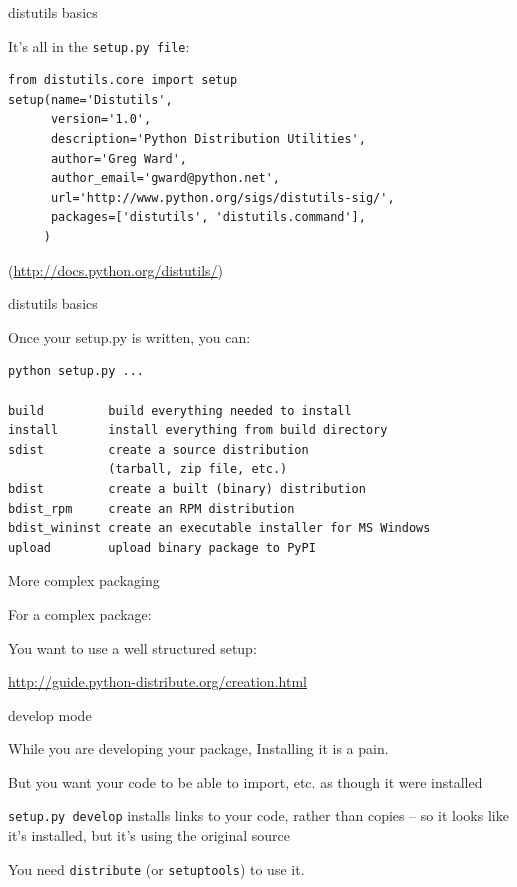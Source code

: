 \documentclass{beamer}
\begin{document}
\begin{frame}[fragile]{distutils basics}

\vfill
{\Large It's all in the \verb|setup.py file|:}

\begin{verbatim}
from distutils.core import setup
setup(name='Distutils',
      version='1.0',
      description='Python Distribution Utilities',
      author='Greg Ward',
      author_email='gward@python.net',
      url='http://www.python.org/sigs/distutils-sig/',
      packages=['distutils', 'distutils.command'],
     )
\end{verbatim}
\vfill
(\url{http://docs.python.org/distutils/})
\end{frame} 

\begin{frame}[fragile]{distutils basics}

{\Large Once your setup.py is written, you can:}

\begin{verbatim}
python setup.py ...

build         build everything needed to install
install       install everything from build directory
sdist         create a source distribution
              (tarball, zip file, etc.)
bdist         create a built (binary) distribution
bdist_rpm     create an RPM distribution
bdist_wininst create an executable installer for MS Windows
upload        upload binary package to PyPI
\end{verbatim}

\end{frame} 

\begin{frame}[fragile]{More complex packaging}

{\Large For a complex package:}

\vfill
{\Large You want to use a well structured setup:}

\vfill
\url{http://guide.python-distribute.org/creation.html}
\vfill
\end{frame} 

\begin{frame}[fragile]{develop mode}

{\Large While you are developing your package, Installing it is a pain.}

\vfill
{\Large But you want your code to be able to import, etc. as though it were installed}

\vfill
{\Large \verb|setup.py develop| installs links to your code, rather than copies
 -- so it looks like it's installed, but it's using the original source}

\vfill
{\Large You need \verb|distribute| (or \verb|setuptools|) to use it.}
\vfill
\end{frame} 
\end{document}
